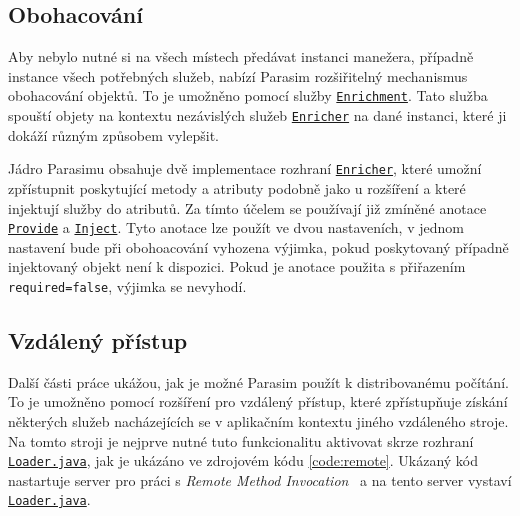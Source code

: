 \subsection{Obohacování}\label{section:enrichment}

Aby nebylo nutné si na všech místech předávat instanci manežera, případně instance všech
potřebných služeb, nabízí Parasim rozšiřitelný mechanismus obohacování objektů.
To je umožněno pomocí služby \href{https://github.com/sybila/parasim/blob/2.0.0.Final/core/src/main/java/org/sybila/parasim/core/api/enrichment/Enrichment.java}{\texttt{Enrichment}}.
Tato služba spouští objety na kontextu nezávislých služeb \href{https://github.com/sybila/parasim/blob/2.0.0.Final/core/src/main/java/org/sybila/parasim/core/spi/enrichment/Enricher.java}{\texttt{Enricher}}
na dané instanci, které ji dokáží různým způsobem vylepšit. 

Jádro Parasimu obsahuje dvě implementace rozhraní \href{https://github.com/sybila/parasim/blob/2.0.0.Final/core/src/main/java/org/sybila/parasim/core/spi/enrichment/Enricher.java}{\texttt{Enricher}},
které umožní zpřístupnit poskytující metody a atributy podobně jako u rozšíření 
a které injektují služby do atributů. Za tímto účelem se používají již zmíněné anotace \href{https://github.com/sybila/parasim/blob/2.0.0.Final/core/src/main/java/org/sybila/parasim/core/annotation/Provide.java}{\texttt{Provide}} a \href{https://github.com/sybila/parasim/blob/2.0.0.Final/core/src/main/java/org/sybila/parasim/core/annotation/Inject.java}{\texttt{Inject}}.
Tyto anotace lze použít ve dvou nastaveních, v jednom nastavení bude při obohoacování
vyhozena výjimka, pokud poskytovaný případně injektovaný objekt není k dispozici.
Pokud je anotace použita s přiřazením \texttt{required=false}, výjimka se nevyhodí.

\subsection{Vzdálený přístup}\label{section:remote}

Další části práce ukážou, jak je možné Parasim použít k distribovanému počítání.
To je umožněno pomocí rozšíření pro vzdálený přístup, které zpří\-stup\-ňu\-je získání
některých služeb nacházejících se v aplikačním kontextu jiného vzdá\-le\-né\-ho stroje.
Na tomto stroji je nejprve nutné tuto funkcionalitu aktivovat skrze rozhraní \href{https://github.com/sybila/parasim/blob/2.0.0.Final/core/src/main/java/org/sybila/parasim/core/api/remote/Loader.java}{\texttt{Loader.java}},
jak je ukázáno ve zdrojovém kódu \ref{code:remote}. Ukázaný kód nastartuje server
pro práci s \textit{Remote Method Invocation}~\cite{grosso2001} a na tento server vystaví \href{https://github.com/sybila/parasim/blob/2.0.0.Final/core/src/main/java/org/sybila/parasim/core/api/remote/Loader.java}{\texttt{Loader.java}}.

